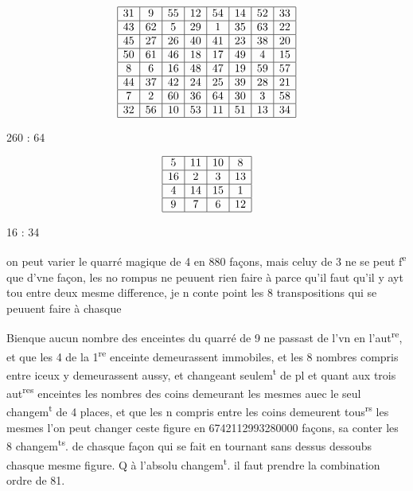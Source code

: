 \documentclass[11pt,a4paper]{article}
\begin{document}
\[
\begin{array}{|c|c|c|c|c|c|c|c|}
\hline
31 & 9 & 55 & 12 & 54 & 14 & 52 & 33 \\
\hline
43 & 62 & 5 & 29 & 1 & 35 & 63 & 22 \\
\hline
45 & 27 & 26 & 40 & 41 & 23 & 38 & 20 \\
\hline
50 & 61 & 46 & 18 & 17 & 49 & 4 & 15 \\
\hline
8 & 6 & 16 & 48 & 47 & 19 & 59 & 57 \\
\hline
44 & 37 & 42 & 24 & 25 & 39 & 28 & 21 \\
\hline
7 & 2 & 60 & 36 & 64 & 30 & 3 & 58 \\
\hline
32 & 56 & 10 & 53 & 11 & 51 & 13 & 34 \\
\hline
\end{array}
\]

260 : 64

\[
\begin{array}{|c|c|c|c|}
\hline
5 & 11 & 10 & 8 \\
\hline
16 & 2 & 3 & 13 \\
\hline
4 & 14 & 15 & 1 \\
\hline
9 & 7 & 6 & 12 \\
\hline
\end{array}
\]

16 : 34

on peut varier le quarré magique de 4 en 880 façons, mais celuy de 3 ne se peut f\textsuperscript{e} que d'vne façon, les no rompus ne peuuent rien faire à \ill{} parce qu'il faut qu'il y ayt tou\ill{} entre deux mesme difference, je n\ill{}  conte point les 8  transpositions qui se peuuent faire à chasque \ill{}

Bienque aucun nombre des enceintes du quarré de 9 ne passast de l'vn en l'aut\textsuperscript{re}, et que les 4\ill{} de la 1\textsuperscript{re} enceinte demeurassent immobiles, et les 8 nombres compris entre iceux y demeurassent aussy, et changeant seulem\textsuperscript{t} de pl\ill{} et quant aux trois aut\textsuperscript{res} enceintes les nombres des coins demeurant  les mesmes auec le seul changem\textsuperscript{t} de 4 places, et que les n compris entre les coins demeurent tous\textsuperscript{rs} les mesmes l'on peut changer ceste figure en 6742112993280000 façons, sa\ill{} conter les 8 changem\textsuperscript{ts}. de chasque façon qui se fait en tournant sans dessus dessoubs chasque mesme figure. Q\ill{} à l'absolu changem\textsuperscript{t}. il faut prendre la combination ordre de 81.
\end{document}
